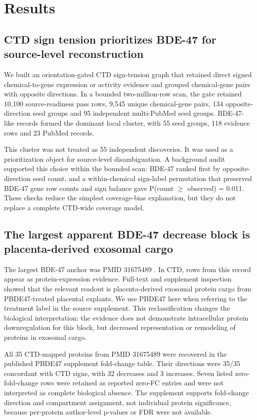 \documentclass[11pt]{article}
\begin{document}
\FloatBarrier
\section{Results}

\subsection{CTD sign tension prioritizes BDE-47 for source-level reconstruction}

We built an orientation-gated CTD sign-tension graph that retained direct signed chemical-to-gene expression or activity evidence and grouped chemical-gene pairs with opposite directions. In a bounded two-million-row scan, the gate retained 10,100 source-readiness pass rows, 9,545 unique chemical-gene pairs, 134 opposite-direction seed groups and 95 independent multi-PubMed seed groups. BDE-47-like records formed the dominant local cluster, with 55 seed groups, 118 evidence rows and 23 PubMed records.

This cluster was not treated as 55 independent discoveries. It was used as a prioritization object for source-level disambiguation. A background audit supported this choice within the bounded scan: BDE-47 ranked first by opposite-direction seed count, and a within-chemical sign-label permutation that preserved BDE-47 gene row counts and sign balance gave P(count $\geq$ observed) = 0.011. These checks reduce the simplest coverage-bias explanation, but they do not replace a complete CTD-wide coverage model.

\subsection{The largest apparent BDE-47 decrease block is placenta-derived exosomal cargo}

The largest BDE-47 anchor was PMID 31675489 \cite{sheller2020}. In CTD, rows from this record appear as protein-expression evidence. Full-text and supplement inspection showed that the relevant readout is placenta-derived exosomal protein cargo from PBDE47-treated placental explants. We use PBDE47 here when referring to the treatment label in the source supplement. This reclassification changes the biological interpretation: the evidence does not demonstrate intracellular protein downregulation for this block, but decreased representation or remodeling of proteins in exosomal cargo.

All 35 CTD-mapped proteins from PMID 31675489 were recovered in the published PBDE47 supplement fold-change table. Their directions were 35/35 concordant with CTD signs, with 32 decreases and 3 increases. Seven listed zero-fold-change rows were retained as reported zero-FC entries and were not interpreted as complete biological absence. The supplement supports fold-change direction and compartment assignment, not individual protein significance, because per-protein author-level p-values or FDR were not available.
\end{document}

